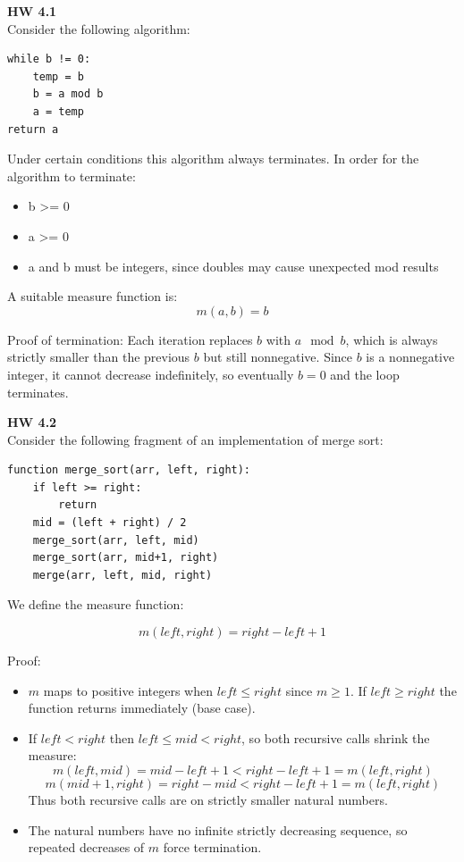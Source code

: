 \documentclass{article}
\theoremstyle{theorem}
\theoremstyle{definition}
\theoremstyle{remark}
\begin{document}
\textbf{HW 4.1} \\

Consider the following algorithm:

\begin{lstlisting}
while b != 0:
    temp = b
    b = a mod b
    a = temp
return a
\end{lstlisting}

Under certain conditions this algorithm always terminates.  
In order for the algorithm to terminate:  
\begin{itemize}
    \item b >= 0
    \item a >= 0
    \item a and b must be integers, since doubles may cause unexpected mod results
\end{itemize}

A suitable measure function is:
\[
m(a,b) = b
\]

Proof of termination: Each iteration replaces $b$ with $a \mod b$, which is always strictly smaller than the previous $b$ but still nonnegative. Since $b$ is a nonnegative integer, it cannot decrease indefinitely, so eventually $b = 0$ and the loop terminates.

\bigskip

\textbf{HW 4.2} \\

Consider the following fragment of an implementation of merge sort:

\begin{lstlisting}
function merge_sort(arr, left, right):
    if left >= right:
        return
    mid = (left + right) / 2
    merge_sort(arr, left, mid)
    merge_sort(arr, mid+1, right)
    merge(arr, left, mid, right)
\end{lstlisting}

We define the measure function:

\[
m(left,right) = right - left + 1
\]

Proof:  
\begin{itemize}
    \item $m$ maps to positive integers when $left \leq right$ since $m \geq 1$. If $left \geq right$ the function returns immediately (base case).
    \item If $left < right$ then $left \leq mid < right$, so both recursive calls shrink the measure:
    \[
    m(left,mid) = mid - left + 1 < right - left + 1 = m(left,right)
    \]
    \[
    m(mid+1,right) = right - mid < right - left + 1 = m(left,right)
    \]
    Thus both recursive calls are on strictly smaller natural numbers.
    \item The natural numbers have no infinite strictly decreasing sequence, so repeated decreases of $m$ force termination.
\end{itemize}
\end{document}

